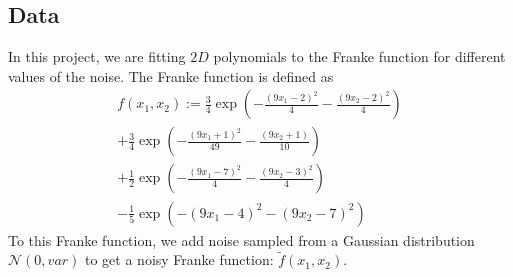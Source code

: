 \subsection{Data} \label{subsec:data_linear_regression}
In this project, we are fitting $2D$ polynomials to the Franke function for different values of the noise. The Franke function is defined as
\begin{equation}
    \begin{split}
        f(x_1,x_2) := \frac{3}{4}\exp{\left(-\frac{(9x_1-2)^2}{4}-\frac{(9x_2-2)^2}{4}\right)} \\ + \frac{3}{4}\exp{\left(-\frac{(9x_1+1)^2}{49}-\frac{(9x_2+1)}{10}\right)} \\+ \frac{1}{2}\exp{\left(-\frac{(9x_1-7)^2}{4}-\frac{(9x_2-3)^2}{4}\right)} \\ - \frac{1}{5}\exp{\left(-(9x_1-4)^2-(9x_2-7)^2 \right)}
    \end{split}
\end{equation}
To this Franke function, we add noise sampled from a Gaussian distribution $\mathcal{N}(0, var)$ to get a noisy Franke function:  $\tilde{f}(x_1,x_2)$. 
